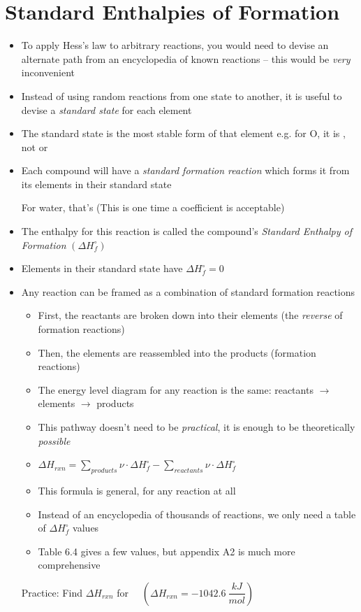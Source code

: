 \documentclass[12pt, openany, letterpaper]{memoir}
\begin{document}
\section{Standard Enthalpies of Formation}
\begin{itemize}
	\item To apply Hess's law to arbitrary reactions, you would need to devise an alternate path from an encyclopedia of known reactions -- this would be \emph{very} inconvenient
	\item Instead of using random reactions from one state to another, it is useful to devise a \emph{standard state} for each element
	\item The standard state is the most stable form of that element e.g. for O, it is , not  or 
	\item Each compound will have a \emph{standard formation reaction} which forms it from its elements in their standard state

	      For water, that's  \hspace{1em} (This is one time a  coefficient is acceptable)
	\item The enthalpy for this reaction is called the compound's \emph{Standard Enthalpy of Formation} $\left(\Delta H^\circ_f\right)$
	\item Elements in their standard state have $\Delta H^\circ_f = 0$
	\item Any reaction can be framed as a combination of standard formation reactions
	      \begin{itemize}
		      \item First, the reactants are broken down into their elements (the \emph{reverse} of formation reactions)
		      \item Then, the elements are reassembled into the products (formation reactions)
		      \item The energy level diagram for any reaction is the same: reactants $\rightarrow$ elements $\rightarrow$ products
		      \item This pathway doesn't need to be \emph{practical}, it is enough to be theoretically \emph{possible}
		      \item $\Delta H_{rxn}=\sum\limits_{products}\nu\cdot\Delta H^\circ_f - \sum\limits_{reactants}\nu\cdot\Delta H^\circ_f$
		      \item This formula is general, for any reaction at all
		      \item Instead of an encyclopedia of thousands of reactions, we only need a table of $\Delta H^\circ_f$ values
		      \item Table 6.4 gives a few values, but appendix A2 is much more comprehensive
	      \end{itemize}
	      Practice: Find $\Delta H_{rxn}$ for~~  \hspace{1em} $\left(\Delta H_{rxn}=-1042.6~\dfrac{kJ}{mol}\right)$


\end{itemize}
\end{document}
